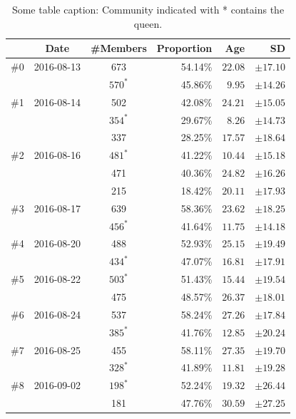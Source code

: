 \begin{table}
\centering
\begin{tabularx}{0.8\textwidth}{lccrrr}
	\toprule
	{} & Date & \#Members & Proportion & Age & SD\\
	\midrule
	\#0 & 2016-08-13 & 673     & 54.14\% & $22.08$ & $\pm17.10$ \\
	  &            & $570^*$ & 45.86\% & $9.95$ & $\pm14.26$ \\
	\midrule 
	\#1 & 2016-08-14 & 502     & 42.08\% & $24.21$ & $\pm15.05$ \\
	  &			   & $354^*$ & 29.67\% &  $8.26$ & $\pm14.73$ \\
	  &			   & 337     & 28.25\% & $17.57$ & $\pm18.64$ \\
	\midrule     
	\#2 & 2016-08-16 & $481^*$ & 41.22\% & $10.44$ & $\pm15.18$ \\
	  &		       & 471     & 40.36\% & $24.82$ & $\pm16.26$ \\
	  &		       & 215     & 18.42\% & $20.11$ & $\pm17.93$ \\
	\midrule  
	\#3 & 2016-08-17 & 639     & 58.36\% & $23.62$ & $\pm18.25$ \\
	  &            & $456^*$ & 41.64\% & $11.75$ & $\pm14.18$ \\
	\midrule   
	\#4 & 2016-08-20 & 488     & 52.93\% & $25.15$ & $\pm19.49$ \\
	  &            & $434^*$ & 47.07\% & $16.81$ & $\pm17.91$ \\
	\midrule   							
	\#5 & 2016-08-22 & $503^*$ & 51.43\% & $15.44$ & $\pm19.54$ \\
	  &            & 475     & 48.57\% & $26.37$ & $\pm18.01$ \\
	\midrule  
	\#6 & 2016-08-24 & 537     & 58.24\% & $27.26$ & $\pm17.84$ \\
	  &            & $385^*$ & 41.76\% & $12.85$ & $\pm20.24$ \\
	\midrule  
	\#7 & 2016-08-25 & 455     & 58.11\% & $27.35$ & $\pm19.70$ \\
	  &            & $328^*$ & 41.89\% & $11.81$ & $\pm19.28$ \\
	\midrule 
	\#8 & 2016-09-02 & $198^*$ & 52.24\% & $19.32$ & $\pm26.44$ \\
	  &            & 181     & 47.76\% & $30.59$ & $\pm27.25$ \\
	\bottomrule
\end{tabularx}
\caption{Some table caption: Community indicated with * contains the queen.}
\label{tab:communities}
\end{table}

